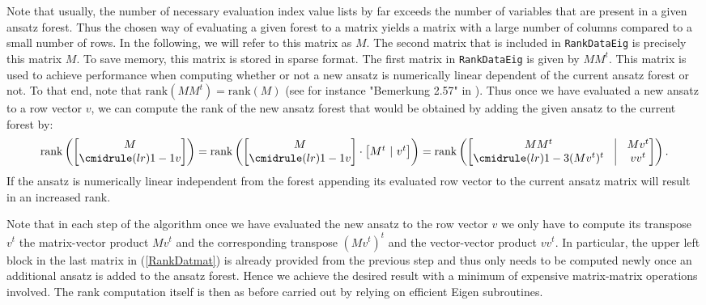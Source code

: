 \documentclass[a4paper,12pt, DIV=14, BCOR=5mm, twoside, headsepline, numbers=noenddot]{scrbook}
\begin{document}
Note that usually, the number of necessary evaluation index value lists by far exceeds the number of variables that are present in a given ansatz forest. Thus the chosen way of evaluating a given forest to a matrix yields a matrix with a large number of columns compared to a small number of rows. In the following, we will refer to this matrix as $M$. The second matrix that is included in \texttt{RankDataEig} is precisely this matrix $M$. To save memory, this matrix is stored in sparse format. The first matrix in \texttt{RankDataEig} is given by $M M^t$. This matrix is used to achieve performance when computing whether or not a new ansatz is numerically linear dependent of the current ansatz forest or not. To that end, note that $\mathrm{rank}(MM^t) = \mathrm{rank}(M)$ (see for instance "Bemerkung 2.57" in \cite{LAKnab}). Thus once we have evaluated a new ansatz to a row vector $v$, we can compute the rank of the new ansatz forest that would be obtained by adding the given ansatz to the current forest by:
\begin{align}\label{RankDatmat}
    \mathrm{rank}\left (\begin{bmatrix}
        M \\
        \cmidrule(lr){1-1} 
        v
    \end{bmatrix} \right )
    = \mathrm{rank} \left ( \begin{bmatrix}
        M \\
        \cmidrule(lr){1-1}
        v
    \end{bmatrix} \cdot \begin{bmatrix}
        M^t \ \vert \  v^t 
    \end{bmatrix} \right ) = \mathrm{rank} \left (\begin{bmatrix}
        MM^t & \vline & M v^t \\
        \cmidrule(lr){1-3}
        (Mv^t)^t & \vline & vv^t 
    \end{bmatrix}  \right ).
\end{align}
If the ansatz is numerically linear independent from the forest appending its evaluated row vector to the current ansatz matrix will result in an increased rank.

Note that in each step of the algorithm once we have evaluated the new ansatz to the row vector $v$ we only have to compute its transpose $v^t$ the matrix-vector product $Mv^t$ and the corresponding transpose $(Mv^t)^t$ and the vector-vector product $v v^t$. In particular, the upper left block in the last matrix in (\ref{RankDatmat}) is already provided from the previous step and thus only needs to be computed newly once an additional ansatz is added to the ansatz forest. Hence we achieve the desired result with a minimum of expensive matrix-matrix operations involved. The rank computation itself is then as before carried out by relying on efficient Eigen subroutines.
\end{document}
